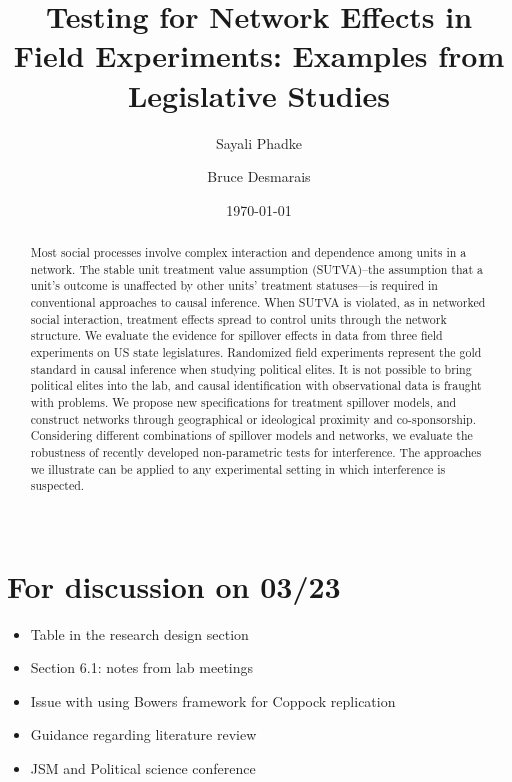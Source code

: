 \documentclass[12pt]{article}
\title{\vspace{-2cm} Testing for Network Effects in Field Experiments: Examples from Legislative Studies }
\author{ Sayali Phadke \and Bruce Desmarais} \date{\today}
\begin{document}
\maketitle




\begin{abstract}

\noindent  Most social processes involve complex interaction and dependence among units in a network. The stable unit treatment value assumption (SUTVA)--the assumption that a unit’s outcome is unaffected by other units’ treatment statuses—is required in conventional approaches to causal inference. When SUTVA is violated, as in networked social interaction, treatment effects spread to control units through the network structure. We evaluate the evidence for spillover effects in data from three field experiments on US state legislatures. Randomized field experiments represent the gold standard in causal inference when studying political elites. It is not possible to bring political elites into the lab, and causal identification with observational data is fraught with problems. We propose new specifications for treatment spillover models, and construct networks through geographical or ideological proximity and co-sponsorship. Considering different combinations of spillover models and networks, we evaluate the robustness of recently developed non-parametric tests for interference. The approaches we illustrate can be applied to any experimental setting in which interference is suspected. \\~\\

\end{abstract}

\section{For discussion on 03/23}
\begin{itemize}

\item Table in the research design section
\item Section 6.1: notes from lab meetings
\item Issue with using Bowers framework for Coppock replication
\item Guidance regarding literature review
\item JSM and Political science conference

\end{itemize}
\end{document}
